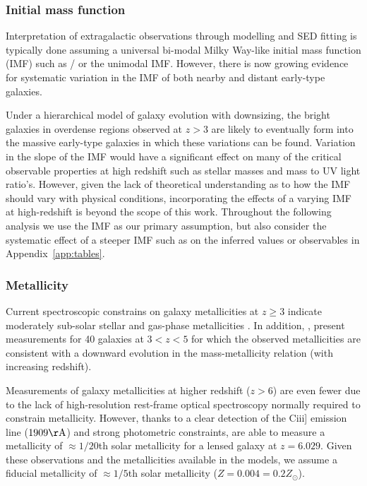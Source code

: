\subsubsection{Initial mass function}
Interpretation of extragalactic observations through modelling and SED fitting is typically done assuming a universal bi-modal Milky Way-like initial mass function (IMF) such as \citet{Kroupa:2001ki}/\citet{Chabrier:2003ki} or the unimodal \citet{Salpeter:1955hz} IMF. However, there is now growing evidence for systematic variation in the IMF of both nearby \citep{vanDokkum:2010ha,Treu:2010kf,Cappellari:2012jm,Conroy:2012bn,Ferreras:2013id} and distant \citep{MartinNavarro:2014wr} early-type galaxies. 

Under a hierarchical model of galaxy evolution with downsizing, the bright galaxies in overdense regions observed at $z > 3$ are likely to eventually form into the massive early-type galaxies in which these variations can be found. Variation in the slope of the IMF would have a significant effect on many of the critical observable properties at high redshift such as stellar masses and mass to UV light ratio's. However, given the lack of theoretical understanding as to how the IMF should vary with physical conditions, incorporating the effects of a varying IMF at high-redshift is beyond the scope of this work. Throughout the following analysis we use the \citet{Chabrier:2003ki} IMF as our primary assumption, but also consider the systematic effect of a steeper IMF such as \citet{Salpeter:1955hz} on the inferred values or observables in Appendix~\ref{app:tables}.
    
\subsubsection{Metallicity}\label{sec:metallicity}
Current spectroscopic constrains on galaxy metallicities at $z \geq 3$ indicate moderately sub-solar stellar and gas-phase metallicities \citep{Shapley:2003wi,Maiolino:2008gs,Laskar:2011cc,Jones:2012kn,2012A&A...539A.136S}. In addition, \citet{Troncoso:2014kg}, present measurements for 40 galaxies at $3 < z < 5$ for which the observed metallicities are consistent with a downward evolution in the mass-metallicity relation (with increasing redshift).
    
Measurements of galaxy metallicities at higher redshift ($z>6$) are even fewer due to the lack of high-resolution rest-frame optical spectroscopy normally required to constrain metallicity. However, thanks to a clear detection of the {\sc Ciii]} emission line ($1909\rm{\AA}$) and strong photometric constraints, \citet{Stark:2014vc} are able to measure a metallicity of $\approx 1/20$th solar metallicity for a lensed galaxy at $z = 6.029$. Given these observations and the metallicities available in the \citet{Bruzual:2003ckb} models, we assume a fiducial metallicity of $\approx 1/5$th solar metallicity ($Z = 0.004 = 0.2 Z_{\odot}$).
        
